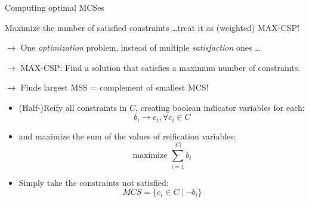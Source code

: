 \documentclass{cons-beamer}
\begin{document}
\begin{frame}{Computing optimal MCSes}
    
  Maximize the number of satisfied constraints \dots treat it as (weighted) MAX-CSP!

  $\xrightarrow{}$ One \textit{optimization} problem, instead of multiple \textit{satisfaction} ones \dots

  $\xrightarrow{}$ MAX-CSP: Find a solution that satisfies a maximum number of constraints.

  $\xrightarrow{}$ Finds largest MSS = complement of smallest MCS!
  \vspace{0.3cm}
  \vfill

  \begin{itemize}
    \item (Half-)Reify all constraints in $C$, creating boolean indicator variables for each: 
          $$b_i \xrightarrow{} c_i, \forall c_i \in C$$
          \vspace{-0.3cm}
    
    \item and maximize the sum of the values of reification variables:
          $$\text{maximize } \sum_{i=1}^{|C|} b_i$$
          \vspace{-0.3cm}

    \item Simply take the constraints not satisfied:
          $$MCS = \{ c_i \in C \mid \neg b_i \}$$
  \end{itemize}
\end{frame}
\end{document}

